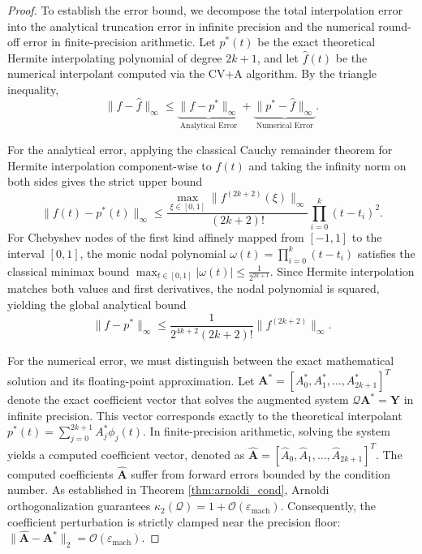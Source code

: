\documentclass[11pt]{article}
\begin{document}
\begin{proof}
To establish the error bound, we decompose the total interpolation error into the analytical truncation error in infinite precision and the numerical round-off error in finite-precision arithmetic. Let $p^*(t)$ be the exact theoretical Hermite interpolating polynomial of degree $2k+1$, and let $\hat{f}(t)$ be the numerical interpolant computed via the CV+A algorithm. By the triangle inequality,
\begin{equation} \label{eq:triangle_approx}
\|f - \hat{f}\|_\infty \leq \underbrace{\|f - p^*\|_\infty}_{\text{Analytical Error}} + \underbrace{\|p^* - \hat{f}\|_\infty}_{\text{Numerical Error}}.
\end{equation}

For the analytical error, applying the classical Cauchy remainder theorem for Hermite interpolation component-wise to $f(t)$ and taking the infinity norm on both sides gives the strict upper bound
$$ \|f(t) - p^*(t)\|_\infty \leq \frac{\max_{\xi \in [0,1]} \|f^{(2k+2)}(\xi)\|_\infty}{(2k+2)!} \prod_{i=0}^k (t - t_i)^2. $$
For Chebyshev nodes of the first kind affinely mapped from $[-1,1]$ to the interval $[0,1]$, the monic nodal polynomial $\omega(t) = \prod_{i=0}^k (t - t_i)$ satisfies the classical minimax bound $\max_{t \in [0,1]} |\omega(t)| \leq \frac{1}{2^{2k+1}}$. Since Hermite interpolation matches both values and first derivatives, the nodal polynomial is squared, yielding the global analytical bound
\begin{equation} \label{eq:analytical_bound}
\|f - p^*\|_\infty \leq \frac{1}{2^{4k+2} (2k+2)!} \|f^{(2k+2)}\|_\infty.
\end{equation}

For the numerical error, we must distinguish between the exact mathematical solution and its floating-point approximation. Let $\mathbf{A}^* = [A^*_0, A^*_1, \dots, A^*_{2k+1}]^T$ denote the exact coefficient vector that solves the augmented system $\mathcal{Q} \mathbf{A}^* = \mathbf{Y}$ in infinite precision. This vector corresponds exactly to the theoretical interpolant $p^*(t) = \sum_{j=0}^{2k+1} A^*_j \phi_j(t)$. In finite-precision arithmetic, solving the system yields a computed coefficient vector, denoted as $\hat{\mathbf{A}} = [\hat{A}_0, \hat{A}_1, \dots, \hat{A}_{2k+1}]^T$. The computed coefficients $\hat{\mathbf{A}}$ suffer from forward errors bounded by the condition number. As established in Theorem \ref{thm:arnoldi_cond}, Arnoldi orthogonalization guarantees $\kappa_2(\mathcal{Q}) = 1 + \mathcal{O}(\varepsilon_{\text{mach}})$. Consequently, the coefficient perturbation is strictly clamped near the precision floor: $\|\hat{\mathbf{A}} - \mathbf{A}^*\|_2 = \mathcal{O}(\varepsilon_{\text{mach}})$.


\end{proof}
\end{document}
